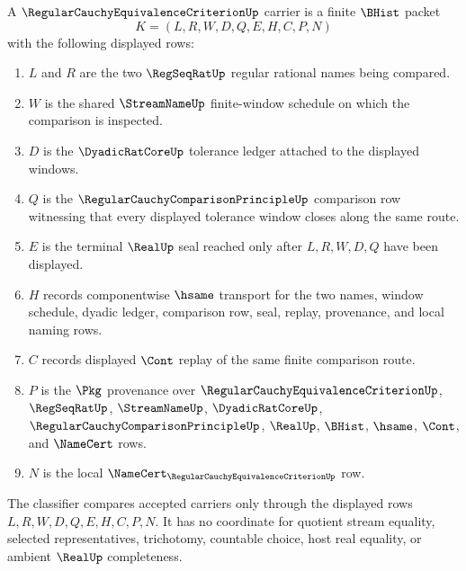 \begin{definition}
\label{def:regular-cauchy-equivalence-criterion-carrier}
A $\RegularCauchyEquivalenceCriterionUp$ carrier is a finite $\BHist$ packet
$$
K=(L,R,W,D,Q,E,H,C,P,N)
$$
with the following displayed rows:
\begin{enumerate}
\item $L$ and $R$ are the two $\RegSeqRatUp$ regular rational names being compared.
\item $W$ is the shared $\StreamNameUp$ finite-window schedule on which the comparison is inspected.
\item $D$ is the $\DyadicRatCoreUp$ tolerance ledger attached to the displayed windows.
\item $Q$ is the $\RegularCauchyComparisonPrincipleUp$ comparison row witnessing that every displayed tolerance window closes along the same route.
\item $E$ is the terminal $\RealUp$ seal reached only after $L,R,W,D,Q$ have been displayed.
\item $H$ records componentwise $\hsame$ transport for the two names, window schedule, dyadic ledger, comparison row, seal, replay, provenance, and local naming rows.
\item $C$ records displayed $\Cont$ replay of the same finite comparison route.
\item $P$ is the $\Pkg$ provenance over $\RegularCauchyEquivalenceCriterionUp$, $\RegSeqRatUp$, $\StreamNameUp$, $\DyadicRatCoreUp$, $\RegularCauchyComparisonPrincipleUp$, $\RealUp$, $\BHist$, $\hsame$, $\Cont$, and $\NameCert$ rows.
\item $N$ is the local $\NameCert_{\RegularCauchyEquivalenceCriterionUp}$ row.
\end{enumerate}
The classifier compares accepted carriers only through the displayed rows $L,R,W,D,Q,E,H,C,P,N$. It has no coordinate for quotient stream equality, selected representatives, trichotomy, countable choice, host real equality, or ambient $\RealUp$ completeness.
\end{definition}

